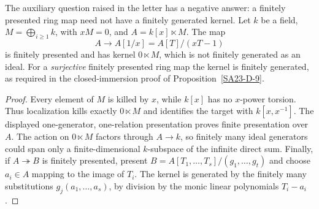 \begin{example}\label{SA23-D-10}
The auxiliary question raised in the letter has a negative answer:
a finitely presented ring map need not have a finitely generated
kernel.  Let $k$ be a field,
$M=\bigoplus_{i\geq1}k$, with $xM=0$, and
$A=k[x]\ltimes M$.  The map
\[
 A\longrightarrow A[1/x]=A[T]/(xT-1)
\]
is finitely presented and has kernel $0\ltimes M$, which is not
finitely generated as an ideal.  For a \emph{surjective} finitely
presented ring map the kernel is finitely generated, as required
in the closed-immersion proof of Proposition~\ref{SA23-D-9}.
\end{example}
\begin{proof}
Every element of $M$ is killed by $x$, while $k[x]$ has no
$x$-power torsion.  Thus localization kills exactly $0\ltimes M$
and identifies the target with $k[x,x^{-1}]$.  The displayed
one-generator, one-relation presentation proves finite
presentation over $A$.  The action on $0\ltimes M$ factors
through $A\to k$, so finitely many ideal generators could span
only a finite-dimensional $k$-subspace of the infinite direct
sum.  Finally, if $A\twoheadrightarrow B$ is finitely presented,
present $B=A[T_1,\ldots,T_s]/(g_1,\ldots,g_t)$ and choose
$a_i\in A$ mapping to the image of $T_i$.  The kernel is generated
by the finitely many substitutions $g_j(a_1,\ldots,a_s)$, by
division by the monic linear polynomials $T_i-a_i$.
\end{proof}

